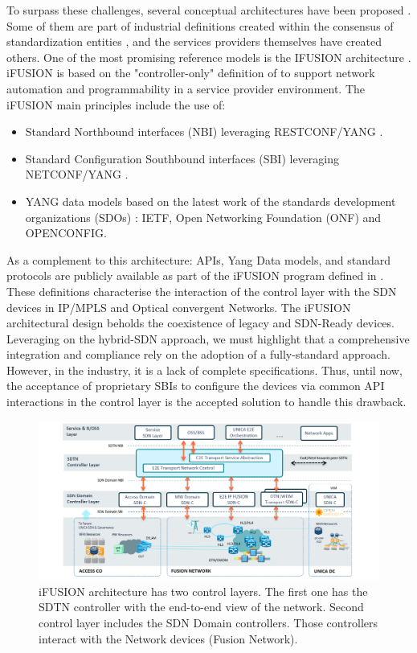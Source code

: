 \documentclass[a4paper,fleqn]{cas-dc}
\begin{document}
To surpass these challenges, several conceptual architectures have been proposed \cite{vissicchio2014opportunities,vissicchio2017safe}. Some of them are part of industrial definitions created within the consensus of standardization entities \cite{lee2015requirements}, and the services providers themselves have created others. One of the most promising reference models is the \uppercase{iFUSION} architecture \cite{contreras2019ifusion}. iFUSION is based on the "controller-only" definition of \cite{sinha2017survey} to support network automation and programmability in a service provider environment. The i\uppercase{FUSION} main principles include the use of:
\begin{itemize}
    \item Standard Northbound interfaces (NBI) leveraging \uppercase{RESTCONF/YANG} \cite{bierman2017RESTCONF}.
    \item Standard Configuration Southbound interfaces (SBI) leveraging \uppercase{NETCONF/YANG} \cite{enns2011network}.
    \item YANG data models based on the latest work of the standards development organizations (SDOs) \cite{bjorklund2016yang}: \uppercase{IETF}, Open Networking Foundation (ONF)  and \uppercase{OpenConfig}.
\end{itemize}

As a complement to this architecture: APIs, Yang Data models, and standard protocols are publicly available as part of the i\uppercase{FUSION} program  defined in  \cite{apistelefonica}. These definitions characterise the interaction of the control layer with the SDN devices in IP/MPLS and Optical convergent Networks. 
The iFUSION architectural design beholds the coexistence of legacy and SDN-Ready devices. Leveraging on the hybrid-SDN approach, we must highlight that a comprehensive integration and compliance rely on the adoption of a fully-standard approach. However,  in the industry, it is a lack of complete specifications. Thus, until now, the acceptance of proprietary SBIs to configure the devices via common API interactions in the control layer is the accepted solution to handle this drawback.

\begin{figure}
	\centering
		\includegraphics[width=\linewidth]{figs/ifusion_architecture.png}
	\caption{i\uppercase{FUSION} architecture has two control layers. The first one has the SDTN controller with the end-to-end view of the network. Second control layer includes the SDN Domain controllers. Those controllers interact with the Network devices (Fusion Network).}
	\label{FIG:1}
\end{figure}
\end{document}
